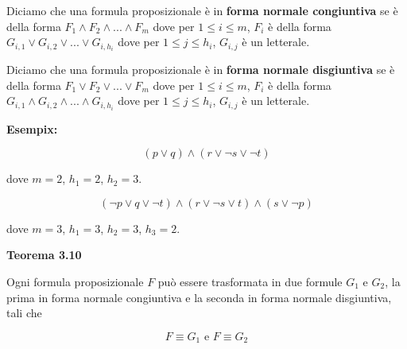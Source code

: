 \begin{flushleft}
\bigskip

Diciamo che una formula proposizionale è in \textbf{forma normale congiuntiva} se
è della forma $F_1 \land F_2 \land ... \land F_m$ dove per $1 \le i \le m$, $F_i$
è della forma $G_{i,1} \lor G_{i,2} \lor ... \lor G_{i,h_i}$ dove per 
$1 \le j \le h_i$, $G_{i, j}$ è un letterale.

\medskip

Diciamo che una formula proposizionale è in \textbf{forma normale disgiuntiva} se
è della forma $F_1 \lor F_2 \lor ... \lor F_m$ dove per $1 \le i \le m$, $F_i$
è della forma $G_{i,1} \land G_{i,2} \land ... \land G_{i,h_i}$ dove per 
$1 \le j \le h_i$, $G_{i, j}$ è un letterale.

\bigskip

\textbf{Esempix:}

\[(p \lor q) \land (r \lor \neg s \lor \neg t)\]

dove $m = 2$, $h_1 = 2$, $h_2 = 3$.

\medskip

\[(\neg p \lor q \lor \neg t) \land (r \lor \neg s \lor t) \land (s \lor \neg p)\]

dove $m = 3$, $h_1 = 3$, $h_2 = 3$, $h_3 = 2$.

\bigskip

\textbf{Teorema 3.10}

Ogni formula proposizionale $F$ può essere trasformata in due formule $G_1$ e $G_2$,
la prima in forma normale congiuntiva e la seconda in forma normale disgiuntiva, tali che

\[ F \equiv G_1 \text{ e } F \equiv G_2 \]

\end{flushleft}